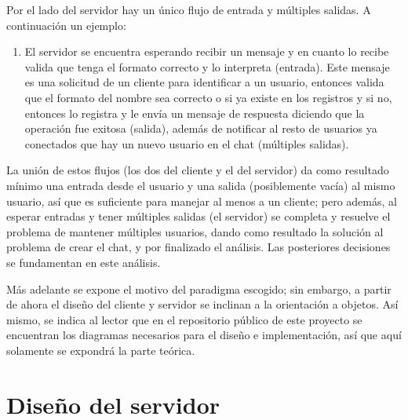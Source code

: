 Por el lado del servidor hay un único flujo de entrada y múltiples salidas. A continuación un ejemplo:
\begin{enumerate}
	\item El servidor se encuentra esperando recibir un mensaje y en cuanto lo recibe valida que tenga el formato correcto y lo interpreta (entrada). Este mensaje es una solicitud de un cliente para identificar a un usuario, entonces valida que el formato del nombre sea correcto o si ya existe en los registros y si no, entonces lo registra y le envía un mensaje de respuesta diciendo que la operación fue exitosa (salida), además de notificar al resto de usuarios ya conectados que hay un nuevo usuario en el chat (múltiples salidas).
\end{enumerate}

La unión de estos flujos (los dos del cliente y el del servidor) da como resultado mínimo una entrada desde el usuario y una salida (posiblemente vacía) al mismo usuario, así que es suficiente para manejar al menos a un cliente; pero además, al esperar entradas y tener múltiples salidas (el servidor) se completa y resuelve el problema de mantener múltiples usuarios, dando como resultado la solución al problema de crear el chat, y por finalizado el análisis. Las posteriores decisiones se fundamentan en este análisis.

Más adelante se expone el motivo del paradigma escogido; sin embargo, a partir de ahora el diseño del cliente y servidor se inclinan a la orientación a objetos. Así mismo, se indica al lector que en el repositorio público de este proyecto se encuentran los diagramas necesarios para el diseño e implementación, así que aquí solamente se expondrá la parte teórica.

\section{Diseño del servidor}

